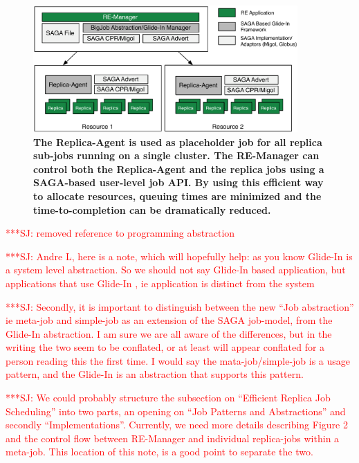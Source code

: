 \documentclass{rspublic}
\newcommand{\jhanote}[1]{ {\textcolor{red} { ***SJ: #1 }}}
\newcommand{\jhanote}[1]{}
\newcommand{\glidein}[1]{Glide-In }
\newcommand{\replicaagent}[1]{Replica-Agent }
\newcommand{\remanager}[1]{RE-Manager }
\begin{document}
\begin{figure}[t]
    \centering
    \includegraphics[width=0.9\textwidth]{remdmanager_v11}
    \caption{\footnotesize \bf The Replica-Agent is used as placeholder
      job for all replica sub-jobs running on a single cluster. The
      \remanager\ can control both the \replicaagent\ and the replica
      jobs using a SAGA-based user-level job API. By using this
      efficient way to allocate resources, queuing times are minimized
      and the time-to-completion can be dramatically reduced.}
    \label{fig:remdmanager_v1.1}
\end{figure}

\jhanote{removed reference to programming abstraction}

\jhanote{Andre L, here is a note, which will hopefully help: as you
  know \glidein\ is a system level abstraction. So we should not say
  \glidein\ based application, but applications that use \glidein\ ,
  ie application is distinct from the system}

\jhanote{Secondly, it is important to distinguish between the new
  ``Job abstraction'' ie meta-job and simple-job as an extension of
  the SAGA job-model, from the \glidein\ abstraction. I am sure we are
  all aware of the differences, but in the writing the two seem to be
  conflated, or at least will appear conflated for a person reading
  this the first time. I would say the mata-job/simple-job is a usage
  pattern, and the \glidein\ is an abstraction that supports this
  pattern.}

\jhanote{We could probably structure the subsection on ``Efficient
  Replica Job Scheduling'' into two parts, an opening on ``Job
  Patterns and Abstractions'' and secondly
  ``Implementations''. Currently, we need more details describing
  Figure 2 and the control flow between \remanager\ and individual
  replica-jobs within a meta-job. This location of this note, is a
  good point to separate the two.}    
\end{document}
